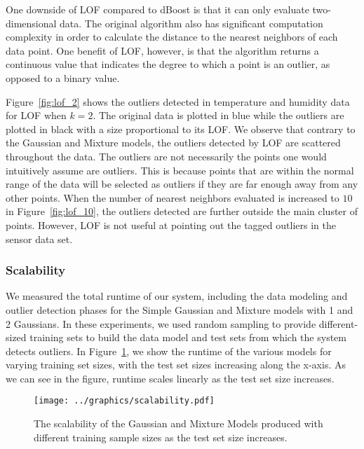 One downside of LOF compared to dBoost is that it can only evaluate two-dimensional data.
The original algorithm also has significant computation complexity in order to calculate the distance to the nearest neighbors of each data point.
One benefit of LOF, however, is that the algorithm returns a continuous value that indicates the degree to which a point is an outlier, as opposed to a binary value.

Figure~\ref{fig:lof_2} shows the outliers detected in temperature and humidity data for LOF when $k=2$.
The original data is plotted in blue while the outliers are plotted in black with a size proportional to its LOF.
We observe that contrary to the Gaussian and Mixture models, the outliers detected by LOF are scattered throughout the data.
The outliers are not necessarily the points one would intuitively assume are outliers.
This is because points that are within the normal range of the data will be selected as outliers if they are far enough away from any other points.
When the number of nearest neighbors evaluated is increased to $10$ in Figure~\ref{fig:lof_10}, the outliers detected are further outside the main cluster of points.
However, LOF is not useful at pointing out the tagged outliers in the sensor data set.

\subsubsection{Scalability}

We measured the total runtime of our system, including the data modeling and outlier detection phases for the Simple Gaussian and Mixture models with 1 and 2 Gaussians.
In these experiments, we used random sampling to provide different-sized training sets to build the data model and test sets from which the system detects outliers.
In Figure~\ref{fig:scaling}, we show the runtime of the various models for varying training set sizes, with the test set sizes increasing along the x-axis.
As we can see in the figure, runtime scales linearly as the test set size increases.

\begin{figure}
\centering
\texttt{[image: ../graphics/scalability.pdf]}
\caption{The scalability of the Gaussian and Mixture Models produced with different training sample sizes as the test set size increases.}
\label{fig:scaling}
\end{figure}
